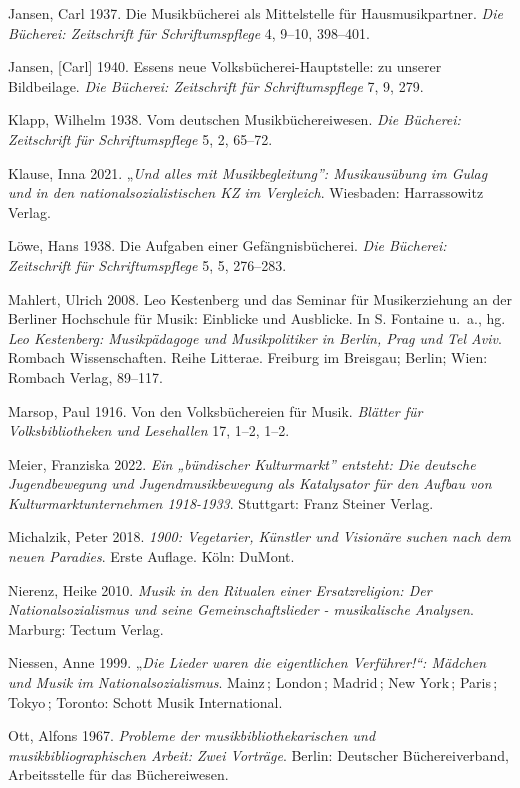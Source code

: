 \documentclass[a4paper,
fontsize=11pt,
oneside,
numbers=noperiodatend,
parskip=half-,
bibliography=totoc,
final
]{scrartcl}
\begin{document}
Jansen, Carl 1937. Die Musikbücherei als Mittelstelle für
Hausmusikpartner. \emph{Die Bücherei: Zeitschrift für Schriftumspflege}
4, 9--10, 398--401.

Jansen, {[}Carl{]} 1940. Essens neue Volksbücherei-Hauptstelle: zu
unserer Bildbeilage. \emph{Die Bücherei: Zeitschrift für
Schriftumspflege} 7, 9, 279.

Klapp, Wilhelm 1938. Vom deutschen Musikbüchereiwesen. \emph{Die
Bücherei: Zeitschrift für Schriftumspflege} 5, 2, 65--72.

Klause, Inna 2021. „\emph{Und alles mit Musikbegleitung'': Musikausübung
im Gulag und in den nationalsozialistischen KZ im Vergleich}. Wiesbaden:
Harrassowitz Verlag.

Löwe, Hans 1938. Die Aufgaben einer Gefängnisbücherei. \emph{Die
Bücherei: Zeitschrift für Schriftumspflege} 5, 5, 276--283.

Mahlert, Ulrich 2008. Leo Kestenberg und das Seminar für Musikerziehung
an der Berliner Hochschule für Musik: Einblicke und Ausblicke. In S.
Fontaine u.~a., hg. \emph{Leo Kestenberg: Musikpädagoge und
Musikpolitiker in Berlin, Prag und Tel Aviv}. Rombach Wissenschaften.
Reihe Litterae. Freiburg im Breisgau; Berlin; Wien: Rombach Verlag,
89--117.

Marsop, Paul 1916. Von den Volksbüchereien für Musik. \emph{Blätter für
Volksbibliotheken und Lesehallen} 17, 1--2, 1--2.

Meier, Franziska 2022. \emph{Ein „bündischer Kulturmarkt'' entsteht: Die
deutsche Jugendbewegung und Jugendmusikbewegung als Katalysator für den
Aufbau von Kulturmarktunternehmen 1918-1933}. Stuttgart: Franz Steiner
Verlag.

Michalzik, Peter 2018. \emph{1900: Vegetarier, Künstler und Visionäre
suchen nach dem neuen Paradies}. Erste Auflage. Köln: DuMont.

Nierenz, Heike 2010. \emph{Musik in den Ritualen einer Ersatzreligion:
Der Nationalsozialismus und seine Gemeinschaftslieder - musikalische
Analysen}. Marburg: Tectum Verlag.

Niessen, Anne 1999. „\emph{Die Lieder waren die eigentlichen
Verführer!{}``: Mädchen und Musik im Nationalsozialismus}. Mainz\,;
London\,; Madrid\,; New York\,; Paris\,; Tokyo\,; Toronto: Schott Musik
International.

Ott, Alfons 1967. \emph{Probleme der musikbibliothekarischen und
musikbibliographischen Arbeit: Zwei Vorträge}. Berlin: Deutscher
Büchereiverband, Arbeitsstelle für das Büchereiwesen.
\end{document}
